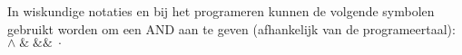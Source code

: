In wiskundige notaties en bij het programeren kunnen de volgende symbolen gebruikt worden om een AND aan te geven (afhankelijk van de programeertaal):
\begin{math}
\land \; \& \; \&\& \; \cdot
\end{math}

